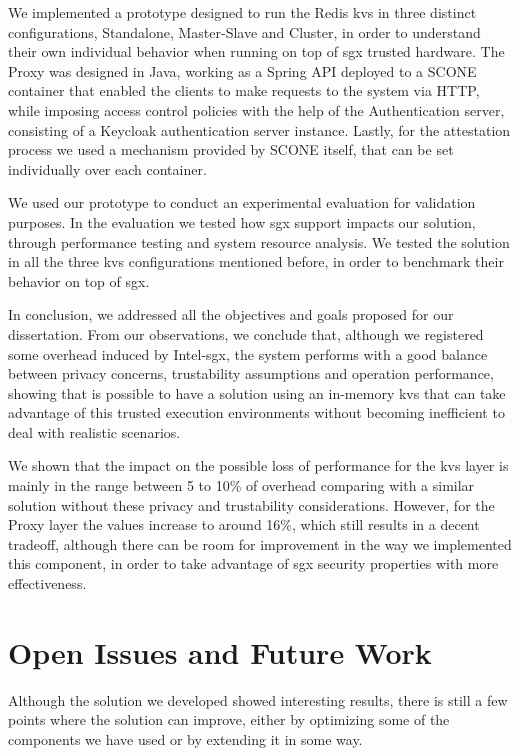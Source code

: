 We implemented a prototype designed to run the Redis \gls{kvs} in three distinct configurations, Standalone, Master-Slave and Cluster, in order to understand their own individual behavior when running on top of \gls{sgx} trusted hardware. 
The Proxy was designed in Java, working as a Spring API deployed to a SCONE container that enabled the clients to make requests to the system via HTTP, while imposing access control policies with the help of the Authentication server, consisting of a Keycloak authentication server instance. 
Lastly, for the attestation process we used a mechanism provided by SCONE itself, that can be set individually over each container.

We used our prototype to conduct an experimental evaluation for validation purposes. In the evaluation we tested how \gls{sgx} support impacts our solution, through performance testing and system resource analysis. We tested the solution in all the three \gls{kvs} configurations mentioned before, in order to benchmark their behavior on top of \gls{sgx}.

In conclusion, we addressed all the objectives and goals proposed for our dissertation. From our observations, we conclude that, although we registered some overhead induced by Intel-\gls{sgx}, the system performs with a good balance between privacy concerns, trustability assumptions and operation performance, showing that is possible to have a solution using an in-memory \gls{kvs} that can take advantage of this trusted execution environments without becoming inefficient to deal with realistic scenarios.

We shown that the impact on the possible loss of performance for the \gls{kvs} layer is mainly in the range between 5 to 10\% of overhead comparing with a similar solution without these privacy and trustability considerations. However, for the Proxy layer the values increase to around 16\%, which still results in a decent tradeoff, although there can be room for improvement in the way we implemented this component, in order to take advantage of \gls{sgx} security properties with more effectiveness.

\section{Open Issues and Future Work}

Although the solution we developed showed interesting results, there is still a few points where the solution can improve, either by optimizing some of the components we have used or by extending it in some way.

